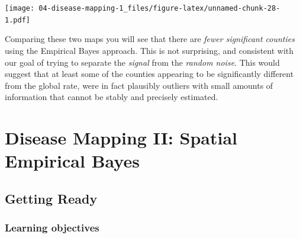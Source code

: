 \documentclass[
]{book}
\begin{document}
\texttt{[image: 04-disease-mapping-1\_files/figure-latex/unnamed-chunk-28-1.pdf]}

Comparing these two maps you will see that there are \emph{fewer significant counties} using the Empirical Bayes approach. This is not surprising, and consistent with our goal of trying to separate the \emph{signal} from the \emph{random noise}. This would suggest that at least some of the counties appearing to be significantly different from the global rate, were in fact plausibly outliers with small amounts of information that cannot be stably and precisely estimated.

\hypertarget{disease-mapping-ii-spatial-empirical-bayes}{%
\chapter{Disease Mapping II: Spatial Empirical Bayes}\label{disease-mapping-ii-spatial-empirical-bayes}}

\hypertarget{getting-ready-3}{%
\section{Getting Ready}\label{getting-ready-3}}

\hypertarget{learning-objectives-4}{%
\subsection{Learning objectives}\label{learning-objectives-4}}

 
  \providecommand{\huxb}[2]{\arrayrulecolor[RGB]{#1}\global\arrayrulewidth=#2pt}
  \providecommand{\huxvb}[2]{\color[RGB]{#1}\vrule width #2pt}
  \providecommand{\huxtpad}[1]{\rule{0pt}{#1}}
  \providecommand{\huxbpad}[1]{\rule[-#1]{0pt}{#1}}
\end{document}
